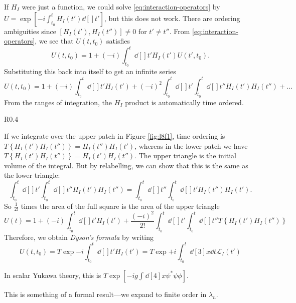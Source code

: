 If $H_I$ were just a function, we could solve \eqref{eq:interaction-operators} by $U = \exp[-i \int_{t_0}^{t} H_I(t') \dd[]{t'}]$, but this does not work.
There are ordering ambiguities since $[H_I(t'), H_I(t'')] \neq 0$ for $t' \neq t''$.
From \eqref{eq:interaction-operators}, we see that $U(t, t_0)$ satisfies
\begin{equation}
  U(t, t_0) = 1 + (-i) \int_{t_0}^{t} \dd[]{t'} H_I(t') U(t', t_0).
\end{equation}
Substituting this back into itself to get an infinite series
\begin{equation}
  U(t, t_0) = 1 + (-i) \int_{t_0}^{t} \dd[]{t'} H_I(t') + (-i)^2 \int_{t_0}^{t} \dd[]{t'} \int_{t_0}^{t} \dd[]{t''} H_I(t') H_I(t'') + \dots
\end{equation}
From the ranges of integration, the $H_I$ product is automatically time ordered.

\begin{wrapfigure}{R}{0.4\textwidth}
  \centering
  \def\svgwidth{0.3\columnwidth}
  
  \caption{}
  \label{fig:l8f1}
\end{wrapfigure}
If we integrate over the upper patch in Figure \ref{fig:l8f1}, time ordering is $T \left\{ H_I(t') H_I(t'') \right\} = H_I(t'') H_I(t')$, whereas in the lower patch we have $T \left\{ H_I(t') H_I(t'') \right\} = H_I(t') H_I(t'')$.
The upper triangle is the initial volume of the integral. But by relabelling, we can show that this is the same as the lower triangle:
\begin{equation}
  \int_{t_0}^{t} \dd[]{t'} \int_{t_0}^{t} \dd[]{t''} H_I(t') H_I(t'')
  = \int_{t_0}^{t} \dd[]{t''} \int_{t_0}^{t} \dd[]{t'} H_I(t'') H_I(t').
\end{equation}
So $\frac{1}{2!}$ times the area of the full square is the area of the upper triangle
\begin{equation}
  U(t) = 1 + (-i) \int_{t_0}^{t} \dd[]{t'} H_I(t')
  + \frac{(-i)^2}{2!} \int_{t_0}^{t} \dd[]{t'} \int_{t_0}^{t} \dd[]{t''} T \left\{ H_I(t') H_I(t'') \right\}
\end{equation}
Therefore, we obtain \emph{Dyson's formula} by writing
\begin{equation}
  U(t, t_0) = T \exp{-i \int_{t_0}^{t} \dd[]{t'} H_I(t')} = T \exp{+i \int_{t_0}^{t} \dd[3]{x} \dd{t} \mathcal{L}_I(t')}
\end{equation}
\begin{example}
  In scalar Yukawa theory, this is $T \exp[-i g \int_{}^{} \dd[4]{x} \psi^* \psi \phi]$.
\end{example}
This is something of a formal result---we expand to finite order in $\lambda_n$.

